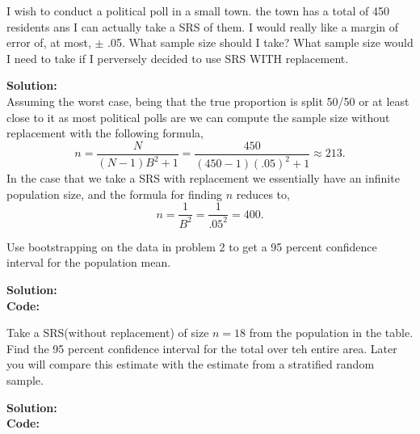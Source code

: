 \documentclass[12pt]{article}
\makeatletter
\theoremstyle{homework}
\newenvironment{exercise}[1]
{\def\@currentlabel{#1}\exercisecore}
{\endexercisecore}
\newcommand{\localhead}[1]{\par\smallskip\noindent\textbf{#1}\nobreak\\}%
\newcommand\solution{\localhead{Solution:}}
\makeatother
\begin{document}
\begin{exercise}{7} I wish to conduct a political poll in a small town. the town has a total of 
    450 residents ans I can actually take a SRS of them. I would really like a margin of error of, at most, 
    $\pm$ .05. What sample size should I take? What sample size would I need to take if I perversely decided to use 
    SRS WITH replacement.\\
    \solution Assuming the worst case, being that the true proportion is split 50/50 or at least close to it as most political polls are
    we can compute the sample size without replacement with the following formula, 
    \begin{equation*}
        n = \dfrac{N}{(N-1)B^2 + 1} = \dfrac{450}{(450-1)(.05)^2 + 1} \approx 213.
    \end{equation*}
    In the case that we take a SRS with replacement we essentially have an infinite population size, and the formula for 
    finding $n$ reduces to, 
    \begin{equation*}
        n = \frac{1}{B^2}=\frac{1}{.05^2}= 400. 
    \end{equation*}
\end{exercise}
\vspace{.25in}

\begin{exercise}{8} Use bootstrapping on the data in problem 2 to get a 95 percent confidence interval for the population 
    mean.\\
    \solution 
    \textbf{Code:}
    \begin{center}
        
    \end{center}
\end{exercise}
\vspace{.25in}

\begin{exercise}{9} Take a SRS(without replacement) of size $n = 18$ from the population in the table. 
    Find the 95 percent confidence interval for the total over teh entire area. Later you will compare this estimate with the estimate from a stratified random sample.\\
    \solution 
    \textbf{Code:}
    \begin{center}
        
    \end{center}
\end{exercise}
\vspace{.25in}
\end{document}
